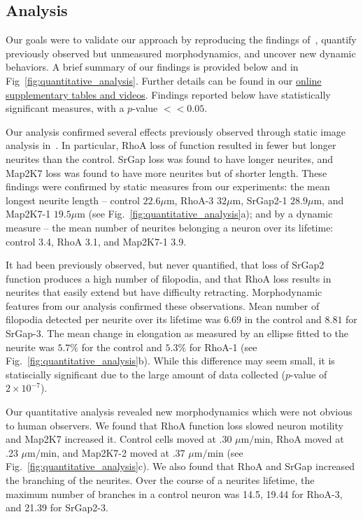 \subsection{Analysis}
Our goals were to  validate our approach by reproducing the findings 
of~\cite{Pertz08},  quantify previously observed but unmeasured morphodynamics,
and  uncover  new dynamic behaviors.
A brief summary of our findings is provided below and in 
Fig~\ref{fig:quantitative_analysis}. Further details can be found in our 
\href{http://web.mit.edu/ggonzale/www/ISBI2013/}{online supplementary tables and videos}.
Findings reported below have statistically significant measures,  with 
a $p$-value $<< 0.05$.


Our analysis confirmed several effects previously observed through static image
analysis  in~\cite{Pertz08}.  In  particular,  RhoA  loss  of  function
resulted in fewer but longer neurites than the control. SrGap loss was
found to have longer neurites, and  Map2K7 loss was found to have
more neurites but of shorter length.  These findings  were confirmed by 
static measures from
our experiments: the mean longest  neurite length -- control $22.6 \mu$m,
 RhoA-3 $32  \mu$m, SrGap2-1 $28.9 \mu$m,  and Map2K7-1 $19.5 \mu$m  
(see  Fig.~\ref{fig:quantitative_analysis}a);  and  by  a  dynamic
measure --  the mean  number of neurites  belonging a neuron  over its
lifetime: control 3.4, RhoA 3.1, and Map2K7-1 3.9.

It  had been previously observed, but  never quantified,  that  loss of
SrGap2 function  produces a  high number of  filopodia, and  that RhoA
loss  results  in neurites  that  easily  extend  but have  difficulty
retracting. Morphodynamic features from our analysis confirmed these
observations. Mean number of filopodia detected per  neurite over its lifetime was $6.69$
in the control  and $8.81$ for SrGap-3. %
The  mean change in elongation
as measured  by an ellipse fitted  to the neurite was  $5.7\%$ for the
control        and        $5.3\%$        for        RhoA-1        (see
Fig.~\ref{fig:quantitative_analysis}b).
While this difference may seem
small,  it is  statiscially significant due  to the  large amount  of  data collected
($p$-value of $2 \times 10^{-7}$).

Our quantitative analysis revealed new morphodynamics which
were not obvious to human  observers. We found that RhoA function loss
slowed  neuron motility and  Map2K7 increased  it.  Control cells
moved at  .30 $\mu  \text{m} / \text{min}$,  RhoA moved  at .23 $\mu  \text{m} /  \text{min}$, and
Map2K7-2     moved     at    .37     $\mu     \text{m}     /    \text{min}$     (see
Fig.~\ref{fig:quantitative_analysis}c).  We  also found that  RhoA and
SrGap  increased the  branching of  the
neurites.
Over the course
of a  neurites lifetime, the maximum  number of branches  in a control
neuron    was    14.5,   19.44    for    RhoA-3,    and   21.39    for
SrGap2-3.

